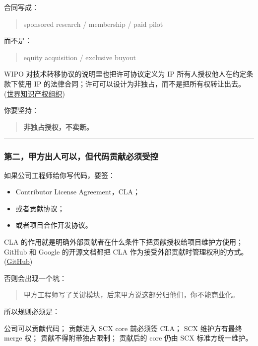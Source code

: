 \documentclass[
  12pt,
]{ctexart}
\newenvironment{Shaded}{}{}
\newcommand{\NormalTok}[1]{#1}
\providecommand{\tightlist}{%
  \setlength{\itemsep}{0pt}\setlength{\parskip}{0pt}}
\begin{document}
合同写成：

\begin{quote}
sponsored research / membership / paid pilot
\end{quote}

而不是：

\begin{quote}
equity acquisition / exclusive buyout
\end{quote}

WIPO 对技术转移协议的说明里也把许可协议定义为 IP
所有人授权他人在约定条款下使用 IP
的法律合同；许可可以设计为非独占，而不是把所有权转让出去。(\href{https://arxiv.org/html/2406.17557v1?utm_source=chatgpt.com}{世界知识产权组织})

你要坚持：

\begin{quote}
\textbf{非独占授权，不卖断。}
\end{quote}

\begin{center}\rule{0.5\linewidth}{0.5pt}\end{center}

\subsubsection{第二，甲方出人可以，但代码贡献必须受控}\label{ux7b2cux4e8cux7532ux65b9ux51faux4ebaux53efux4ee5ux4f46ux4ee3ux7801ux8d21ux732eux5fc5ux987bux53d7ux63a7}

如果公司工程师给你写代码，要签：

\begin{itemize}
\tightlist
\item
  Contributor License Agreement，CLA；
\item
  或者贡献协议；
\item
  或者项目合作开发协议。
\end{itemize}

CLA
的作用就是明确外部贡献者在什么条件下把贡献授权给项目维护方使用；GitHub
和 Google 的开源文档都把 CLA
作为接受外部贡献时管理权利的方式。(\href{https://arxiv.org/abs/2501.07314?utm_source=chatgpt.com}{GitHub})

否则会出现一个坑：

\begin{quote}
甲方工程师写了关键模块，后来甲方说这部分归他们，你不能商业化。
\end{quote}

所以规则必须是：

\begin{Shaded}
\begin{Highlighting}[]
\NormalTok{公司可以贡献代码；}
\NormalTok{贡献进入 SCX core 前必须签 CLA；}
\NormalTok{SCX 维护方有最终 merge 权；}
\NormalTok{贡献不得附带独占限制；}
\NormalTok{贡献后的 core 仍由 SCX 标准方统一维护。}
\end{Highlighting}
\end{Shaded}
\end{document}
